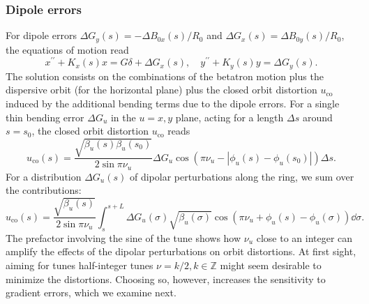 \subsubsection{Dipole errors}
    For dipole errors $\Delta G_y(s)=-\Delta B_{0x}(s)/R_0$ and $\Delta G_x(s)=\Delta B_{0y}(s)/R_0$, the equations of motion read
    \begin{equation}
        x^{\prime\prime}+K_x(s)x=G\delta + \Delta G_x(s), \quad
        y^{\prime\prime}+K_y(s)y = \Delta G_y(s).
        \label{eq:dip_errEOM}
    \end{equation}
    The solution consists on the combinations of the betatron motion plus the dispersive orbit (for the horizontal plane) plus the closed orbit distortion $u_{\text{co}}$ induced by the additional bending terms due to the dipole errors. For a single thin bending error $\Delta G_u$ in the $u=x,y$ plane, acting for a length $\Delta s$ around $s=s_0$, the closed orbit distortion $u_{\text{co}}$ reads
    \begin{equation}
        u_{\text{co}}(s) = \frac{\sqrt{\beta_u(s)\beta_u(s_0)}}{2\sin\pi\nu_u}\Delta G_u\cos( \pi\nu_u - |\phi_u(s)-\phi_u(s_0)|)\Delta s.
        \label{eq:cod}
    \end{equation}
    For a distribution $\Delta G_u(s)$ of dipolar perturbations along the ring, we sum over the contributions:
    \begin{equation}
        u_{\text{co}}(s) = \frac{\sqrt{\beta_u(s)}}{2\sin\pi\nu_u}\int_{s}^{s+L} \Delta G_u(\sigma)\sqrt{\beta_u(\sigma)}\cos(\pi\nu_u + \phi_u(s) - \phi_u(\sigma))\dd{\sigma}.
        \label{eq:co_dist}
    \end{equation}
    The prefactor involving the sine of the tune shows how $\nu_{u}$ close to an integer can amplify the effects of the dipolar perturbations on orbit distortions. At first sight, aiming for tunes half-integer tunes $\nu=k/2, k\in\mathbb{Z}$ might seem desirable to minimize the distortions. Choosing so, however, increases the sensitivity to gradient errors, which we examine next.


